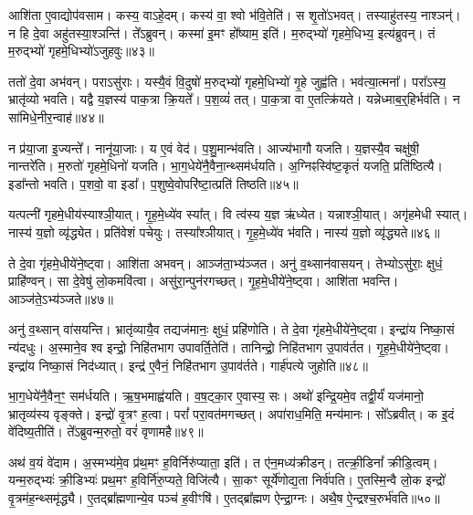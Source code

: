 आशि॑ता ए॒वाद्योप॑वसाम।
कस्य॒ वाऽहे॒दम्।
कस्य॑ वा॒ श्वो भ॑वि॒तेति॑।
स शृ॒तो॑\-ऽभवत्।
तस्याहु॑तस्य॒ नाश्ञन्॑।
न हि दे॒वा अहु॑तस्या॒श्ञन्ति॑।
ते᳚ऽब्रुवन्।
कस्मा॑ इ॒मꣳ हो᳚ष्याम॒ इति॑।
म॒रुद्भ्यो॑ गृहमे॒धिभ्य॒ इत्य॑ब्रुवन्।
तं म॒रुद्भ्यो॑ गृहमे॒धिभ्यो॑\-ऽजुहवुः॥४३॥\ip

ततो॑ दे॒वा अभ॑वन्।
पराऽसु॑राः।
यस्यै॒वं वि॒दुषो॑ म॒रुद्भ्यो॑ गृहमे॒धिभ्यो॑ गृ॒हे जुह्व॑ति।
भव॑त्या॒त्मना᳚।
परा᳚ऽस्य॒ भ्रातृ॑व्यो भवति।
यद्वै य॒ज्ञस्य॑ पाक॒त्रा क्रि॒यते᳚।
प॒श॒व्यं॑ तत्।
पा॒क॒त्रा वा ए॒तत्क्रि॑यते।
यन्नेध्माब॒र्॒हिर्भव॑ति।
न सा॑मिधे॒नीर॒न्वाह॑॥४४॥\ip

न प्र॑या॒जा इ॒ज्यन्ते᳚।
नानू॑या॒जाः।
य ए॒वं वेद॑।
प॒शु॒मान्भ॑वति।
आज्य॑\-भागौ यजति।
य॒ज्ञस्यै॒व चक्षु॑षी॒ नान्तरे॑ति।
म॒रुतो॑ गृहमे॒धिनो॑ यजति।
भा॒ग॒धेये॑नै॒वैना॒न्थ्सम॑र्ध\-यति।
अ॒ग्निꣴस्वि॑ष्ट॒कृतं॑ यजति॒ प्रति॑\-ष्ठित्यै।
इडा᳚न्तो भवति।
प॒शवो॒ वा इडा᳚।
प॒शुष्वे॒वोपरि॑ष्टा॒त्प्रति॑ तिष्ठति॥४५॥\ip{}

यत्पत्नी॑ गृहमे॒धीय॑स्याश्ञी॒यात्।
गृ॒ह॒मे॒ध्ये॑व स्या᳚त्।
वि त्व॑स्य य॒ज्ञ ऋ॑ध्येत।
यन्नाश्ञी॒यात्।
अगृ॑हमेधी स्यात्।
नास्य॑ य॒ज्ञो व्यृ॑द्ध्येत।
प्रति॑\-वेशं पचेयुः।
तस्या᳚श्ञीयात्।
गृ॒ह॒मे॒ध्ये॑व भ॑वति।
नास्य॑ य॒ज्ञो व्यृ॑द्ध्यते॥४६॥\ip

ते दे॒वा गृ॑हमे॒धीये॑ने॒ष्ट्वा।
आशि॑ता अभवन्।
आञ्ज॑ता॒भ्य॑ञ्जत।
अनु॑ व॒थ्सान॑वासयन्।
तेभ्यो\-ऽसु॑राः॒ क्षुधं॒ प्राहि॑ण्वन्।
सा दे॒वेषु॑ लो॒कमवि॑त्वा।
असु॑रा॒न्पुन॑रगच्छत्।
गृ॒ह॒मे॒धीये॑ने॒ष्ट्वा।
आशि॑ता भवन्ति।
आञ्ज॑ते॒\-ऽभ्य॑ञ्जते॥४७॥\ip

अनु॑ व॒थ्सान् वा॑सयन्ति।
भ्रातृ॑व्यायै॒व तद्यज॑मानः॒ क्षुधं॒ प्रहि॑णोति।
ते दे॒वा गृ॑हमे॒धीये॑ने॒ष्ट्वा।
इन्द्रा॑य निष्का॒सं न्य॑दधुः।
अ॒स्माने॒व श्व इन्द्रो॒ निहि॑तभाग उपावर्ति॒तेति॑।
तानिन्द्रो॒ निहि॑तभाग उ॒पाव॑र्तत।
गृ॒ह॒मे॒धीये॑ने॒ष्ट्वा।
इन्द्रा॑य निष्का॒सं निद॑ध्यात्।
इन्द्र॑ ए॒वैनं॒ निहि॑तभाग उ॒पाव॑र्तते।
गार्\mbox{}ह॑पत्ये जुहोति॥४८॥\ip

भा॒ग॒धेये॑नै॒वैन॒ꣳ॒ सम॑र्धयति।
ऋ॒ष॒भमाह्व॑यति।
व॒ष॒ट्का॒र ए॒वास्य॒ सः।
अथो॑ इन्द्रि॒यमे॒व तद्वी॒र्यं॑ यज॑मानो॒ भ्रातृव्य॑स्य वृङ्क्ते।
इन्द्रो॑ वृ॒त्रꣳ ह॒त्वा।
परां᳚ परा॒वत॑मगच्छत्।
अपा॑राध॒मिति॒ मन्य॑मानः।
सो᳚ऽब्रवीत्।
क इ॒दं वे॑दिष्य॒तीति॑।
ते᳚ऽब्रुवन्म॒रुतो॒ वरं॑ वृणामहै॥४९॥\ip

अथ॑ व॒यं वे॑दाम।
अ॒स्मभ्य॑मे॒व प्र॑थ॒मꣳ ह॒विर्निरु॑प्याता॒ इति॑।
त ए॑न॒मध्य॑क्रीडन्।
तत्क्री॒डिनां᳚ क्रीडि॒त्वम्।
यन्म॒रुद्भ्यः॑ क्री॒डिभ्यः॑ प्रथ॒मꣳ ह॒विर्नि॑रु॒प्यते॒ विजि॑त्यै।
सा॒कꣳ सूर्ये॑णोद्य॒ता निर्व॑पति।
ए॒तस्मि॒न्वै लो॒क इन्द्रो॑ वृ॒त्रम॑ह॒न्थ्समृ॑द्ध्यै।
ए॒तद्ब्रा᳚ह्मणान्ये॒व पञ्च॑ ह॒वीꣳषि॑।
ए॒तद्ब्रा᳚ह्मण ऐन्द्रा॒ग्नः।
अथै॒ष ऐ॒न्द्रश्च॒रुर्भ॑वति॥५०॥\ip

